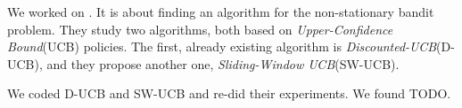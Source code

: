 We worked on \cite{garivier2008upperconfidence}. It is about finding an algorithm for the non-stationary bandit problem. They study two algorithms, both based on \textit{Upper-Confidence Bound}(UCB) policies. The first, already existing algorithm is \textit{Discounted-UCB}(D-UCB), and they propose another one, \textit{Sliding-Window UCB}(SW-UCB).

We coded D-UCB and SW-UCB and re-did their experiments. We found TODO.